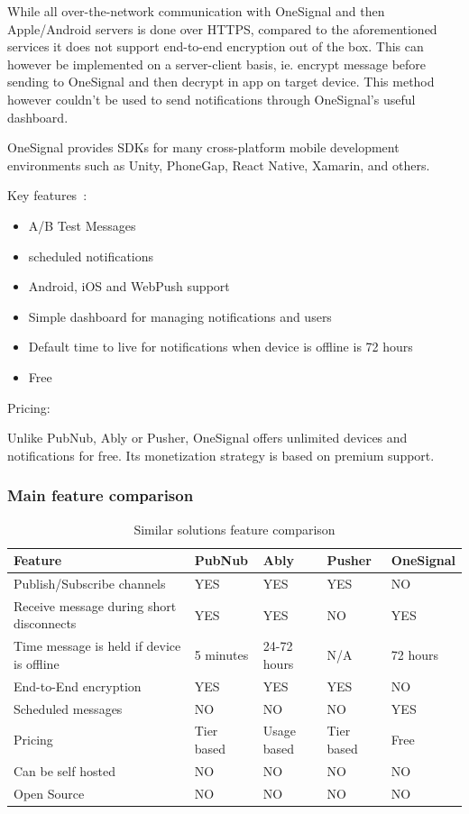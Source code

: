 While all over-the-network communication with OneSignal and then Apple/Android servers is done over HTTPS, compared to the aforementioned services it does not support end-to-end encryption out of the box\cite{onesignal-https}. This can however be implemented on a server-client basis, ie. encrypt message before sending to OneSignal and then decrypt in app on target device. This method however couldn't be used to send notifications through OneSignal's useful dashboard.

OneSignal provides SDKs for many cross-platform mobile development environments such as Unity, PhoneGap, React Native, Xamarin, and others.

Key features~\protect\cite{onesignal}:
\begin{itemize}
\item A/B Test Messages
\item scheduled notifications
\item Android, iOS and WebPush support
\item Simple dashboard for managing notifications and users
\item Default time to live for notifications when device is offline is 72 hours\cite{onesignal-ttl}
\item Free
\end{itemize}

Pricing:

Unlike PubNub, Ably or Pusher, OneSignal offers unlimited devices and notifications for free. Its monetization strategy is based on premium support.

\subsubsection*{Main feature comparison}

\begin{table}[!ht]
\begin{center}
\begin{tabular}{|l|l|l|l|l|}
\hline
\textbf{Feature} & \textbf{PubNub} & \textbf{Ably} & \textbf{Pusher} & \textbf{OneSignal} \\
\hline
Publish/Subscribe channels & YES & YES & YES & NO \\
\hline
Receive message during short disconnects & YES & YES & NO & YES \\
\hline
Time message is held if device is offline & 5 minutes & 24-72 hours & N/A & 72 hours \\
\hline
End-to-End encryption & YES & YES & YES & NO \\
\hline
Scheduled messages & NO & NO & NO & YES \\
\hline
Pricing & Tier based & Usage based & Tier based & Free \\
\hline
Can be self hosted & NO & NO & NO & NO \\
\hline
Open Source & NO & NO & NO & NO \\
\hline
\end{tabular}
\end{center}
\caption{Similar solutions feature comparison}
\label{tab:ex_db}
\end{table}

